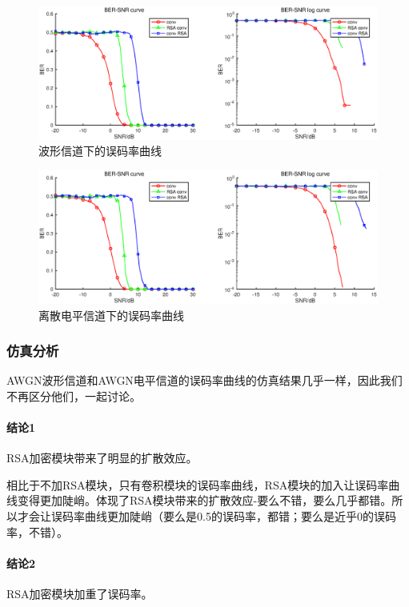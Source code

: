 \begin{figure}[h]
	\centering
    \includegraphics[width=6.0in]{./pic/rsamod0.eps}
	\caption{波形信道下的误码率曲线}
\end{figure}

\begin{figure}[h]
	\centering
    \includegraphics[width=6.0in]{./pic/rsamod1.eps}
	\caption{离散电平信道下的误码率曲线}
\end{figure}

\subsubsection{仿真分析}

AWGN波形信道和AWGN电平信道的误码率曲线的仿真结果几乎一样，因此我们不再区分他们，一起讨论。

\paragraph{结论1}RSA加密模块带来了明显的扩散效应。

相比于不加RSA模块，只有卷积模块的误码率曲线，RSA模块的加入让误码率曲线变得更加陡峭。体现了RSA模块带来的扩散效应-要么不错，要么几乎都错。所以才会让误码率曲线更加陡峭（要么是0.5的误码率，都错；要么是近乎0的误码率，不错）。

\paragraph{结论2}RSA加密模块加重了误码率。


